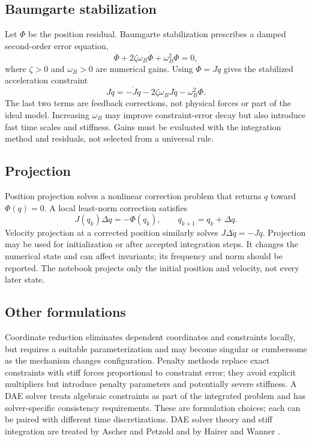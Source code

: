 \documentclass[../main.tex]{subfiles}
\begin{document}
\subsection{Baumgarte stabilization}
Let \(\Phi\) be the position residual. Baumgarte stabilization prescribes a damped second-order error equation,
\begin{equation}
 \ddot\Phi+2\zeta\omega_B\dot\Phi+\omega_B^2\Phi=0,
\end{equation}
where \(\zeta>0\) and \(\omega_B>0\) are numerical gains. Using \(\dot\Phi=J\dot q\) gives the stabilized acceleration constraint
\begin{equation}
 J\ddot q=-\dot J\dot q-2\zeta\omega_B J\dot q-\omega_B^2\Phi.
\end{equation}
The last two terms are feedback corrections, not physical forces or part of the ideal model. Increasing \(\omega_B\) may improve constraint-error decay but also introduce fast time scales and stiffness. Gains must be evaluated with the integration method and residuals, not selected from a universal rule.

\subsection{Projection}
Position projection solves a nonlinear correction problem that returns \(q\) toward \(\Phi(q)=0\). A local least-norm correction satisfies
\begin{equation}
 J(q_k)\Delta q=-\Phi(q_k),\qquad q_{k+1}=q_k+\Delta q.
\end{equation}
Velocity projection at a corrected position similarly solves \(J\Delta\dot q=-J\dot q\). Projection may be used for initialization or after accepted integration steps. It changes the numerical state and can affect invariants; its frequency and norm should be reported. The notebook projects only the initial position and velocity, not every later state.

\subsection{Other formulations}
Coordinate reduction eliminates dependent coordinates and constraints locally, but requires a suitable parameterization and may become singular or cumbersome as the mechanism changes configuration. Penalty methods replace exact constraints with stiff forces proportional to constraint error; they avoid explicit multipliers but introduce penalty parameters and potentially severe stiffness. A DAE solver treats algebraic constraints as part of the integrated problem and has solver-specific consistency requirements. These are formulation choices; each can be paired with different time discretizations. DAE solver theory and stiff integration are treated by Ascher and Petzold and by Hairer and Wanner \cite{ascherpetzold1998,hairerwanner1996}.
\end{document}
